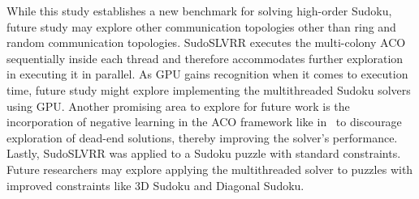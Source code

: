 While this study establishes a new benchmark for solving high-order Sudoku, future study may explore other communication topologies other than ring and random communication topologies. SudoSLVRR executes the multi-colony ACO sequentially inside each thread and therefore accommodates further exploration in executing it in parallel. As GPU gains recognition when it comes to execution time, future study might explore implementing the multithreaded Sudoku solvers using GPU. Another promising area to explore for future work is the incorporation of negative learning in the ACO framework like in~\cite{Masukane, nurcahyadi2022negative, Haynes, james} to discourage exploration of dead-end solutions, thereby improving the solver’s performance.  Lastly, SudoSLVRR was applied to a Sudoku puzzle with standard constraints. Future researchers may explore applying the multithreaded solver to puzzles with improved constraints like 3D Sudoku and Diagonal Sudoku. 

